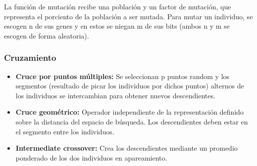 \documentclass[twoside,twocolumn]{article} %
\begin{document}
	La funci\'on de mutaci\'on recibe una poblaci\'on y un factor de mutaci\'on, que representa el porciento de la poblaci\'on a ser mutada. Para mutar un individuo, se escogen n de sus genes y en estos se niegan m de sus bits (ambos n y m se escogen de forma aleatoria).
	
	\subsubsection{Cruzamiento}
	
	\begin{itemize}
		\item  \textbf{Cruce por puntos m\'ultiples:} Se seleccionan p puntos random y los segmentos (resultado de picar los individuos por dichos puntos) alternos de los individuos se intercambian para obtener nuevos descendientes.
		\item \textbf{Cruce geom\'etrico:} Operador independiente de la representación definido sobre la distancia del espacio de búsqueda. Los descendientes deben estar en el segmento entre los individuos.
		\item \textbf{Intermediate crossover:} Crea los descendientes mediante un promedio ponderado de los dos individuos en apareamiento.
	\end{itemize}
	
	
\end{document}
